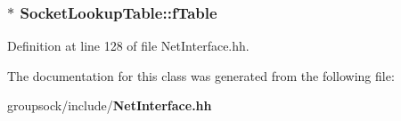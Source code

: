 \subsubsection[{f\+Table}]{$\ast$ Socket\+Lookup\+Table\+::f\+Table\hspace{0.3cm}{\ttfamily [private]}}\label{classSocketLookupTable_a42b39177906fb0e8c97aee6e074714f3}


Definition at line 128 of file Net\+Interface.\+hh.



The documentation for this class was generated from the following file\+:\begin{DoxyCompactItemize}
\item 
groupsock/include/{\bf Net\+Interface.\+hh}\end{DoxyCompactItemize}
